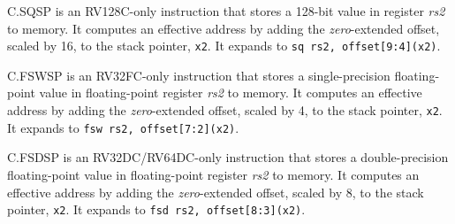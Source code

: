 C.SQSP is an RV128C-only instruction that stores a 128-bit value in register
{\em rs2} to memory.  It computes an effective address by adding the {\em
zero}-extended offset, scaled by 16, to the stack pointer, {\tt x2}.
It expands to {\tt sq rs2, offset[9:4](x2)}.

C.FSWSP is an RV32FC-only instruction that stores a single-precision
floating-point value in floating-point register {\em rs2} to memory.  It
computes an effective address by adding the {\em zero}-extended offset, scaled
by 4, to the stack pointer, {\tt x2}.  It expands to {\tt fsw rs2,
offset[7:2](x2)}.

C.FSDSP is an RV32DC/RV64DC-only instruction that stores a double-precision
floating-point value in floating-point register {\em rs2} to memory.  It
computes an effective address by adding the {\em zero}-extended offset, scaled
by 8, to the stack pointer, {\tt x2}.  It expands to {\tt fsd rs2,
offset[8:3](x2)}.

